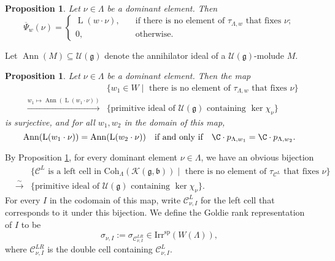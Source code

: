 \documentclass[12pt,a4paper]{amsart}
\def\subset{\subseteq}
\newcommand{\CC}{{\mathcal {C}}}
\newcommand{\CK}{{\mathcal {K}}}
\newcommand{\CO}{{\mathcal {O}}}
\newcommand{\CU}{{\mathcal {U}}}
\DeclareMathOperator{\Ann}{Ann}
\newcommand{\oL}{\operatorname{L}}
\newcommand{\g}{\mathfrak g}
\renewcommand{\b}{\mathfrak b}
\newcommand{\be}{\begin {equation}}
\newcommand{\ee}{\end {equation}}
\numberwithin{equation}{section}
\newtheorem{prop}[thm]{Proposition}
\theoremstyle{remark}
\def\Irr{\mathrm{Irr}}
\def\hha{{}^a\fhh}
\def\Coh{\mathrm{Coh}}
\begin{document}
\begin{prop}
Let $\nu\in \Lambda$ be a dominant element. Then
\[
\overline \Psi_w(\nu)=\left\{
                  \begin{array}{ll}
                    \oL(w\cdot \nu),\quad &\textrm{if there is no element of  $\tau_{\Lambda, w}$ that fixes $\nu$};\\
                    0, \quad &\textrm{otherwise}.
                    \end{array}
                    \right.
                    \]



\end{prop}


Let $\Ann(M)\subset \mathcal U(\g)$ denote the annihilator ideal of a $\mathcal U(\g)$-molude $M$.

\begin{prop}\label{primitivei}
Let $\nu\in \Lambda$ be a dominant element. Then  the map
\begin{eqnarray*}
 && \{w_1\in W\mid \textrm{ there is no element of  $\tau_{\Lambda, w}$ that fixes $\nu$}\}\\
 &\xrightarrow{w_1\mapsto \Ann( \oL(w_1\cdot \nu))}  & \{\textrm{primitive ideal of $\CU(\g)$ containing $\ker \chi_\nu$}\}
\end{eqnarray*}
is surjective, and for all $w_1, w_2$ in the domain of this map,
\[
  \Ann(\oL(w_1\cdot \nu))=\Ann(\oL(w_2\cdot \nu))\quad \textrm{if and only if}\quad \C\cdot p_{\Lambda, w_1}=\C\cdot p_{\Lambda, w_2}.
\]

   \end{prop}

By Proposition \ref{primitivei}, for every dominant element $\nu\in \Lambda$, we have an obvious bijection
\begin{eqnarray*}
 && \{\CC^L \textrm{ is a left cell in $\Coh_{\Lambda}( \CK(\g,\b))$}
 \mid \textrm{ there is no element of  $\tau_{\CC^L}$ that fixes $\nu$}\}\\
 &\xrightarrow{\sim} & \{\textrm{primitive ideal of $\CU(\g)$ containing $\ker \chi_\nu$}\}.
\end{eqnarray*}
For every $I$ in the codomain of this map, write $\CC^L_{\nu, I}$ for the left cell that corresponds to it under this bijection.
We define the Goldie rank representation of $I$ to be
\be\label{grrj}
\sigma_{\nu, I}:=\sigma_{\CC^{LR}_{\nu,I} }\in \Irr^{\mathrm{sp}}(W(\Lambda)),
\ee
where $\CC^{LR}_{\nu,I}$ is the double cell containing $\CC^L_{\nu, I}$.
\end{document}
